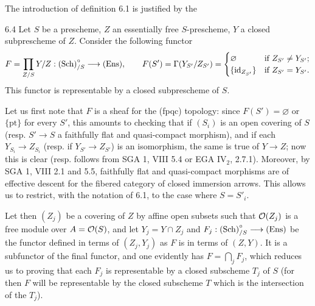 The introduction of definition 6.1 is justified by the
\begin{theorem}{6.4}\label{VIII.6.4}
Let $S$ be a prescheme, $Z$ an essentially free $S$-prescheme, $Y$ a closed subprescheme of $Z$. Consider the following functor
\[
F=\prod_{Z/S}Y/Z:\textup{(Sch)}_{/S}^{\circ}\longrightarrow\textup{(Ens)},\qquad
F(S')=\Gamma(Y_{S'}/Z_{S'})=
\begin{cases}\varnothing&\text{if }Z_{S'}\ne Y_{S'};\\\{\mathrm{id}_{Z_{S'}}\}&\text{if }Z_{S'}=Y_{S'}.\end{cases}
\]
This functor is representable by a closed subprescheme of $S$.
\end{theorem}
 Let us first note that $F$ is a sheaf for the (fpqc) topology: since $F(S')=\varnothing$ or $\{\mathrm{pt}\}$ for every $S'$, this amounts to checking that if $(S_i)$ is an open covering of $S$ (resp. $S'\to S$ a faithfully flat and quasi-compact morphism), and if each $Y_{S_i}\to Z_{S_i}$ (resp. if $Y_{S'}\to Z_{S'}$) is an isomorphism, the same is true of $Y\to Z$; now this is clear (resp. follows from SGA 1, VIII 5.4 or EGA IV$_2$, 2.7.1).
Moreover, by SGA 1, VIII 2.1 and 5.5, faithfully flat and quasi-compact morphisms are of effective descent for the fibered category of closed immersion arrows. This allows us to restrict, with the notation of 6.1, to the case where $S=S'_i$.

Let then $(Z_j)$ be a covering of $Z$ by affine open subsets such that $\mathcal{O}(Z_j)$ is a free module over $A=\mathcal{O}(S)$, and let $Y_j=Y\cap Z_j$ and $F_j:\textup{(Sch)}_{/S}^{\circ}\longrightarrow\textup{(Ens)}$ be the functor defined in terms of $(Z_j,Y_j)$ as $F$ is in terms of $(Z,Y)$. It is a subfunctor of the final functor, and one evidently has $F=\bigcap_j F_j$, which reduces us to proving that each $F_j$ is representable by a closed subscheme $T_j$ of $S$ (for then $F$ will be representable by the closed subscheme $T$ which is the intersection of the $T_j$).
